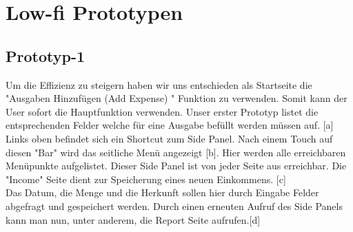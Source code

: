 \documentclass[runningheads,a4paper]{llncs}
\begin{document}
\begin{figure}
\centering
{}
\end{figure}


\clearpage

\section{Low-fi Prototypen}
\subsection{Prototyp-1}

Um die Effizienz zu steigern haben wir uns entschieden als Startseite die "Ausgaben Hinzufügen (Add Expense) " Funktion zu verwenden. Somit kann der User sofort die Hauptfunktion verwenden. 
Unser erster Prototyp listet die entsprechenden Felder welche für eine Ausgabe befüllt werden müssen auf. [a]
Links oben befindet sich ein Shortcut zum Side Panel. Nach einem Touch auf diesen "Bar" wird das seitliche Menü angezeigt [b]. Hier werden alle erreichbaren Menüpunkte aufgelistet. Dieser Side Panel ist von jeder Seite aus erreichbar.
Die "Income" Seite dient zur Speicherung eines neuen Einkommens. [c]\\Das Datum, die Menge und die Herkunft sollen hier durch Eingabe Felder abgefragt und gespeichert werden. Durch einen erneuten Aufruf des Side Panels kann man nun, unter anderem, die Report Seite aufrufen.[d]
\end{document}
